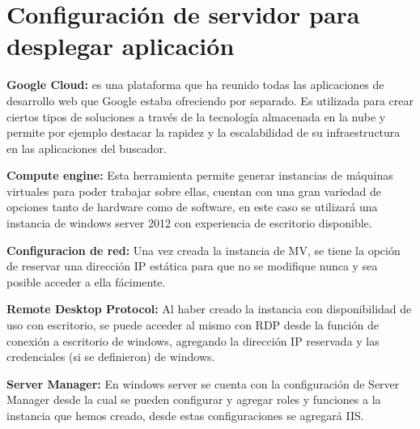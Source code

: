 \section{Configuración de servidor para desplegar aplicación}

\textbf{Google Cloud:} es una plataforma que ha reunido todas las aplicaciones de desarrollo web que Google estaba ofreciendo por separado. Es utilizada para crear ciertos tipos de soluciones a través de la tecnología almacenada en la nube y permite por ejemplo destacar la rapidez y la escalabilidad de su infraestructura en las aplicaciones del buscador.


\newpage

\textbf{Compute engine:} Esta herramienta permite generar instancias de máquinas virtuales para poder trabajar sobre ellas, cuentan con una gran variedad de opciones tanto de hardware como de software, en este caso se utilizará una instancia de windows server 2012 con experiencia de escritorio disponible.


\newpage

\textbf{Configuracion de red:} Una vez creada la instancia de MV, se tiene la opción de reservar una dirección IP estática para que no se modifique nunca y sea posible acceder a ella fácimente.


\newpage

\textbf{Remote Desktop Protocol:} Al haber creado la instancia con disponibilidad de uso con escritorio, se puede acceder al mismo con RDP desde la función de conexión a escritorio de windows, agregando la dirección IP reservada y las credenciales (si se definieron) de windows.


\newpage

\textbf{Server Manager:} En windows server se cuenta con la configuración de Server Manager desde la cual se pueden configurar y agregar roles y funciones a la instancia que hemos creado, desde estas configuraciones se agregará IIS.


\newpage


